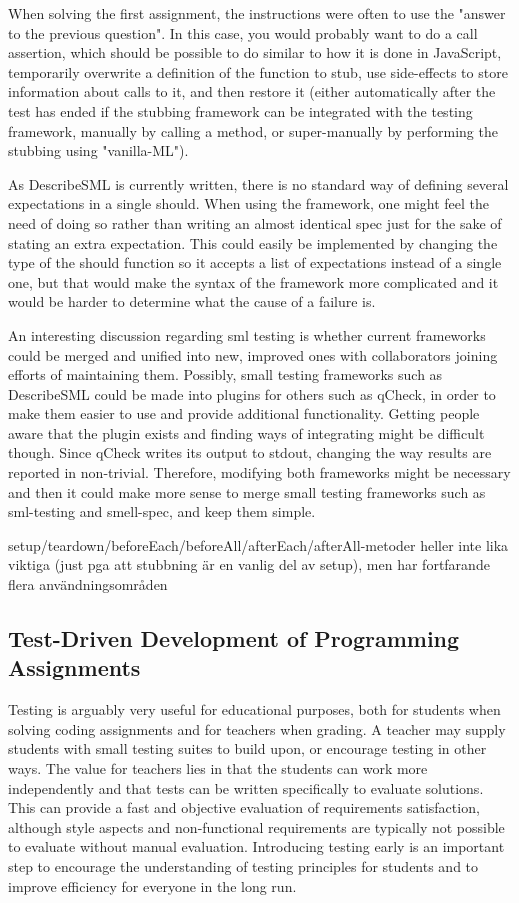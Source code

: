 \documentclass[11pt]{article}
\begin{document}
When solving the first assignment, the instructions were often to use the "answer to the previous question". In this case, you would probably want to do a call assertion, which should be possible to do similar to how it is done in JavaScript, temporarily overwrite a definition of the function to stub, use side-effects to store information about calls to it, and then restore it (either automatically after the test has ended if the stubbing framework can be integrated with the testing framework, manually by calling a method, or super-manually by performing the stubbing using "vanilla-ML").

As DescribeSML is currently written, there is no standard way of defining several expectations in a single should. When using the framework, one might feel the need of doing so rather than writing an almost identical spec just for the sake of stating an extra expectation. This could easily be implemented by changing the type of the should function so it accepts a list of expectations instead of a single one, but that would make the syntax of the framework more complicated and it would be harder to determine what the cause of a failure is.

An interesting discussion regarding \gls{sml} testing is whether current frameworks could be merged and unified into new, improved ones with collaborators joining efforts of maintaining them. Possibly, small testing frameworks such as DescribeSML could be made into plugins for others such as qCheck, in order to make them easier to use and provide additional functionality. Getting people aware that the plugin exists and finding ways of integrating might be difficult though. Since qCheck writes its output to stdout, changing the way results are reported in non-trivial. Therefore, modifying both frameworks might be necessary and then it could make more sense to merge small testing frameworks such as sml-testing and smell-spec, and keep them simple.



setup/teardown/beforeEach/beforeAll/afterEach/afterAll-metoder heller inte lika viktiga (just pga att stubbning är en vanlig del av setup), men har fortfarande flera användningsområden

\subsection{Test-Driven Development of Programming Assignments}
\label{subsec:tddmooc}

Testing is arguably very useful for educational purposes, both for students when solving coding assignments and for teachers when grading.
A teacher may supply students with small testing suites to build upon, or encourage testing in other ways.
The value for teachers lies in that the students can work more independently and that tests can be written specifically to evaluate solutions.
This can provide a fast and objective evaluation of requirements satisfaction, although style aspects and non-functional requirements are typically not possible to evaluate without manual evaluation.
Introducing testing early is an important step to encourage the understanding of testing principles for students and to improve efficiency for everyone in the long run.
\end{document}
